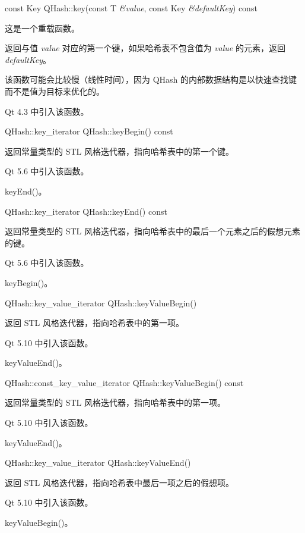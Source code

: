 const Key QHash::key(const T \emph{\&value}, const Key \emph{\&defaultKey}) const

这是一个重载函数。

返回与值 \emph{value} 对应的第一个键，如果哈希表不包含值为 \emph{value} 的元素，返回 \emph{defaultKey}。

该函数可能会比较慢（线性时间），因为 QHash 的内部数据结构是以快速查找键而不是值为目标来优化的。

Qt 4.3 中引入该函数。

QHash::key\_iterator QHash::keyBegin() const

返回常量类型的 STL 风格迭代器，指向哈希表中的第一个键。

Qt 5.6 中引入该函数。

\begin{seeAlso}
 keyEnd()。
\end{seeAlso}

QHash::key\_iterator QHash::keyEnd() const

返回常量类型的 STL 风格迭代器，指向哈希表中的最后一个元素之后的假想元素的键。

Qt 5.6 中引入该函数。

\begin{seeAlso}
keyBegin()。
\end{seeAlso}

QHash::key\_value\_iterator QHash::keyValueBegin()

返回 STL 风格迭代器，指向哈希表中的第一项。

Qt 5.10 中引入该函数。

\begin{seeAlso}
 keyValueEnd()。
\end{seeAlso}


QHash::const\_key\_value\_iterator QHash::keyValueBegin() const

返回常量类型的 STL 风格迭代器，指向哈希表中的第一项。

Qt 5.10 中引入该函数。

\begin{seeAlso}
 keyValueEnd()。
\end{seeAlso}

QHash::key\_value\_iterator QHash::keyValueEnd()

返回 STL 风格迭代器，指向哈希表中最后一项之后的假想项。

Qt 5.10 中引入该函数。

\begin{seeAlso}
keyValueBegin()。
\end{seeAlso}


